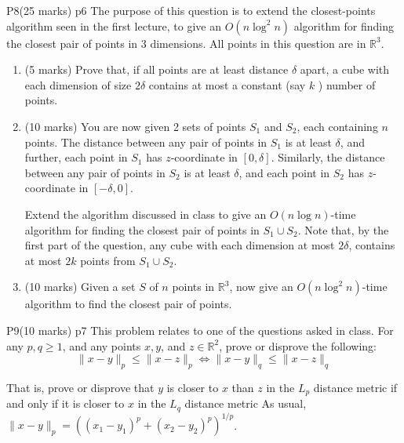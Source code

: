 \documentclass[a4paper, 11pt]{article}
\begin{document}
\begin{problem}{%
	P8\hfill  (25 marks)
}{p6%
}
The purpose of this question is to extend the closest-points algorithm seen in the first lecture, to give an $O\left(n \log ^2 n\right)$ algorithm for finding the closest pair of points in 3 dimensions. All points in this question are in $\mathbb{R}^3$.
\begin{enumerate}[label=(\alph*)]
	\item (5 marks) Prove that, if all points are at least distance $\delta$ apart, a cube with each dimension of size $2 \delta$ contains at most a constant (say $k$ ) number of points.
	\item (10 marks) You are now given 2 sets of points $S_1$ and $S_2$, each containing $n$ points. The distance between any pair of points in $S_1$ is at least $\delta$, and further, each point in $S_1$ has $z$-coordinate in $[0, \delta]$. Similarly, the distance between any pair of points in $S_2$ is at least $\delta$, and each point in $S_2$ has $z$-coordinate in $[-\delta, 0]$.
	
Extend the algorithm discussed in class to give an $O(n \log n)$-time algorithm for finding the closest pair of points in $S_1 \cup S_2$. Note that, by the first part of the question, any cube with each dimension at most $2 \delta$, contains at most $2 k$ points from $S_1 \cup S_2$.
\item  (10 marks) Given a set $S$ of $n$ points in $\mathbb{R}^3$, now give an $O\left(n \log ^2 n\right)$-time algorithm to find the closest pair of points.

\end{enumerate}

\end{problem}
\solve{

}

\begin{problem}{%
		P9\hfill  (10 marks)
	}{p7%
	}
This problem relates to one of the questions asked in class. For any $p, q \geq 1$, and any points $x, y$, and $z \in \mathbb{R}^2$, prove or disprove the following:
		$$
		\|x-y\|_p \leq\|x-z\|_p \Leftrightarrow\|x-y\|_q \leq\|x-z\|_q
		$$

	
	That is, prove or disprove that $y$ is closer to $x$ than $z$ in the $L_p$ distance metric if and only if it is closer to $x$ in the $L_q$ distance metric
	As usual, $\|x-y\|_p=\left(\left(x_1-y_1\right)^p+\left(x_2-y_2\right)^p\right)^{1 / p}$.
\end{problem}
\solve{
	
}
\end{document}
